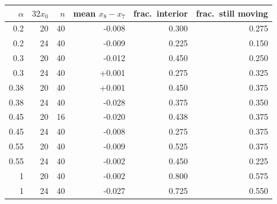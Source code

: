 \begin{tabular}{rrrrrr}
\toprule
$\alpha$ & $32x_0$ & $n$ & mean $x_8-x_7$ & frac.\ interior & frac.\ still moving \\
\midrule
0.2 & 20 & 40 & -0.008 & 0.300 & 0.275 \\
0.2 & 24 & 40 & -0.009 & 0.225 & 0.150 \\
0.3 & 20 & 40 & -0.012 & 0.450 & 0.250 \\
0.3 & 24 & 40 & +0.001 & 0.275 & 0.325 \\
0.38 & 20 & 40 & +0.001 & 0.450 & 0.375 \\
0.38 & 24 & 40 & -0.028 & 0.375 & 0.350 \\
0.45 & 20 & 16 & -0.020 & 0.438 & 0.375 \\
0.45 & 24 & 40 & -0.008 & 0.275 & 0.375 \\
0.55 & 20 & 40 & -0.009 & 0.525 & 0.375 \\
0.55 & 24 & 40 & -0.002 & 0.450 & 0.225 \\
1 & 20 & 40 & -0.002 & 0.800 & 0.575 \\
1 & 24 & 40 & -0.027 & 0.725 & 0.550 \\
\bottomrule
\end{tabular}